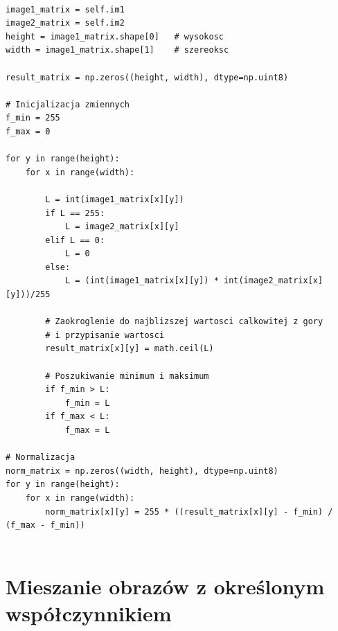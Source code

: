\documentclass[final,a4paper,openany,12pt]{mwbk}
\begin{document}
\begin{lstlisting}[caption=Mnożenie obrazu szarego przez inny obraz ]

image1_matrix = self.im1
image2_matrix = self.im2
height = image1_matrix.shape[0]   # wysokosc
width = image1_matrix.shape[1]    # szereoksc

result_matrix = np.zeros((height, width), dtype=np.uint8)

# Inicjalizacja zmiennych
f_min = 255
f_max = 0

for y in range(height):
    for x in range(width):  

        L = int(image1_matrix[x][y]) 
        if L == 255:
            L = image2_matrix[x][y]
        elif L == 0:
            L = 0
        else:
            L = (int(image1_matrix[x][y]) * int(image2_matrix[x][y]))/255 

        # Zaokroglenie do najblizszej wartosci calkowitej z gory
        # i przypisanie wartosci
        result_matrix[x][y] = math.ceil(L)
                        
        # Poszukiwanie minimum i maksimum
        if f_min > L:
            f_min = L
        if f_max < L:
            f_max = L

# Normalizacja
norm_matrix = np.zeros((width, height), dtype=np.uint8)
for y in range(height):
    for x in range(width):
        norm_matrix[x][y] = 255 * ((result_matrix[x][y] - f_min) / (f_max - f_min))
    

\end{lstlisting}

\section {Mieszanie obrazów z określonym współczynnikiem}
\end{document}
